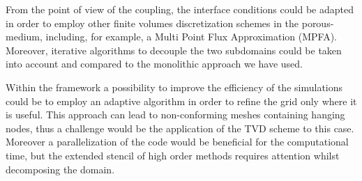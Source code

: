 From the point of view of the coupling, the interface conditions could be adapted in order to employ other finite volumes discretization schemes in the porous-medium, including, for example, a Multi Point Flux Approximation (MPFA).
Moreover, iterative algorithms to decouple the two subdomains could be taken 
into account and compared to the monolithic approach we have used.

Within the \DUMUX framework a possibility to improve the efficiency of the 
simulations could be to employ an adaptive algorithm in order to refine the grid 
only where it is useful. This approach can lead to non-conforming meshes 
containing hanging nodes, thus a challenge would be the application of the TVD 
scheme to this case. Moreover a parallelization of the code would be 
beneficial for the computational time, but the extended stencil of high order methods 
requires attention whilst decomposing the domain.